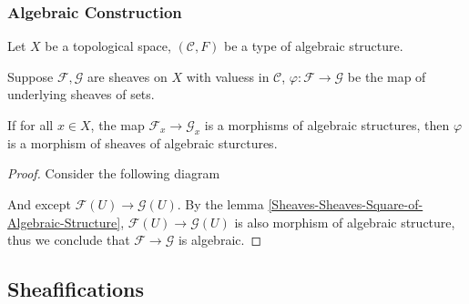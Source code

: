\documentclass[Total.tex]{subfiles}
\begin{document}
				\subsubsection{Algebraic Construction}
				\begin{lemma}
					Let $X$ be a topological space, $(\mathcal{C},F)$ be a type of algebraic structure.
					
					Suppose $\mathcal{F},\mathcal{G}$ are sheaves on $X$ with valuess in $\mathcal{C}$, $\varphi:\mathcal{F}\rightarrow \mathcal{G}$ be the map of underlying sheaves of sets. 
					
					If for all $x\in X$, the map $\mathcal{F}_x\rightarrow \mathcal{G}_x$ is a morphisms of algebraic structures, then $\varphi$ is a morphism of sheaves of algebraic sturctures.
				\end{lemma}
				\begin{proof}
					Consider the following diagram
					\begin{center}
					\end{center}
					
					And except $\mathcal{F}(U)\rightarrow \mathcal{G}(U)$. By the lemma \ref{Sheaves-Sheaves-Square-of-Algebraic-Structure}, $\mathcal{F}(U)\rightarrow \mathcal{G}(U)$ is also morphism of algebraic structure, thus we conclude that $\mathcal{F}\rightarrow\mathcal{G}$ is algebraic.
				\end{proof}
			
			\subsection{Sheafifications}
			
\end{document}
